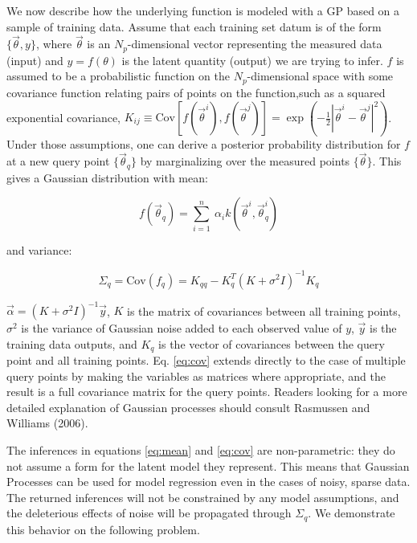 \documentclass[useAMS,usenatbib,tightenlines,11pt,preprint]{aastex}
\begin{document}
We now describe how the underlying function is modeled with a GP based on a
sample of training data.  Assume that each training set datum is of the
form $\{\vec{\theta},y\}$, where $\vec{\theta}$ is an $N_p$-dimensional
vector representing the measured data (input) and $y = f(\theta)$ is the
latent quantity (output) we are trying to infer.  $f$ is assumed to be a
probabilistic function on the $N_p$-dimensional space with some covariance
function relating pairs of points on the function,such as a squared
exponential covariance,
$K_{ij}\equiv\text{Cov}\left[f(\vec{\theta}^{i}),f(\vec{\theta}^{j})\right]
= \exp(-\frac{1}{2}|\vec{\theta}^{i} - \vec{\theta}^{j}|^2)$.  Under those
assumptions, one can derive a posterior probability distribution for $f$
at a new query point $\{\vec{\theta}_{q}\}$ by marginalizing over
the measured points $\{\vec{\theta}\}$.  This gives a Gaussian distribution
with mean:

\begin{equation}
f(\vec{\theta}_{q}) = \sum_{i=1}^n \
\alpha_i k(\vec{\theta}^{i},\vec{\theta}_{q}^{i})
\label{eq:mean}
\end{equation}

\noindent
and variance:

\begin{equation}
\Sigma_{q} = \text{Cov}(f_{q}) = K_{qq} - K_q^T (K + \sigma^2I)^{-1} K_q
\label{eq:cov}
\end{equation}

\noindent
$\vec{\alpha} = (K + \sigma^2 I)^{-1}\vec{y}$, $K$ is the matrix of
covariances between all training points, $\sigma^2$ is the variance of
Gaussian noise added to each observed value of $y$, $\vec{y}$
is the training data outputs, and
$K_q$ is the vector of covariances between the query point and all
training points.  Eq. \ref{eq:cov} extends directly to the case of multiple
query points by making the variables as matrices where appropriate, and the
result is a full covariance matrix for the query points.  Readers looking
for a more detailed explanation of Gaussian processes should consult
Rasmussen and Williams (2006).

The inferences in equations \ref{eq:mean} and \ref{eq:cov} are non-parametric:
they do not assume a form for the latent model they represent.  This means that
Gaussian Processes can be used for model regression even in the cases of noisy,
sparse data.  The returned inferences will not be constrained by any model
assumptions, and the deleterious effects of noise will be propagated through
$\Sigma_q$.  We demonstrate this behavior on the following problem.
\end{document}

